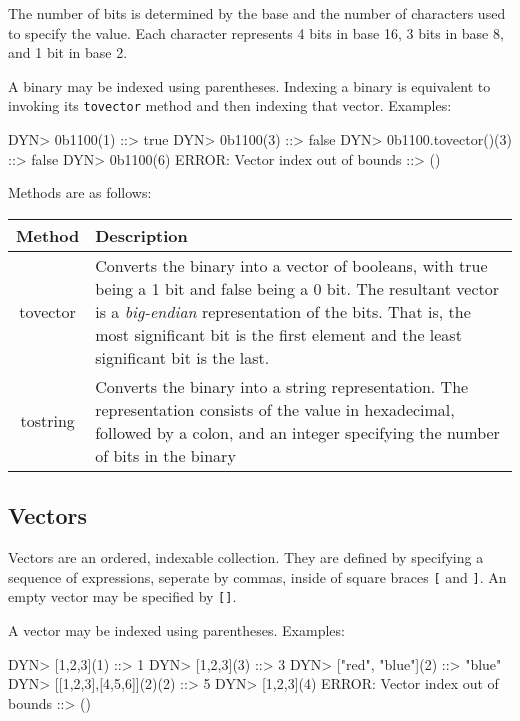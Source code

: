 \documentclass[11pt]{article}
\newcommand{\literal}[1]{\lstinline[style=DSL,identifierstyle=\itshape]!#1!}
\newcommand{\keyword}[1]{\literal{#1}}
\newcommand{\variable}[1]{\literal{#1}}
\begin{document}
The number of bits is determined by the base and the number of characters used to specify the value.
Each character represents 4 bits in base 16, 3 bits in base 8, and 1 bit in base 2.

A binary may be indexed using parentheses.  Indexing a binary is equivalent to invoking its \variable{tovector} method
and then indexing that vector.  Examples:


\begin{dsl}
DYN> 0b1100(1)
::> true
DYN> 0b1100(3)
::> false
DYN> 0b1100.tovector()(3)
::> false
DYN> 0b1100(6)
ERROR: Vector index out of bounds
::> ()
\end{dsl}

Methods are as follows:

\begin{center}
\begin{tabular}{|c|p{3.5in}|}
\hline
Method & Description\\
\hline
tovector & Converts the binary into a vector of booleans, with true being a 1 bit and false being a 0 bit.  The resultant vector is a {\it big-endian}
representation of the bits.  That is, the most significant bit is the first element and the least significant bit is the last.\\
\hline
tostring & Converts the binary into a string representation.  The representation consists of the value in hexadecimal, followed by a colon, and an integer specifying the number of bits in the binary \\
\hline
\end{tabular}
\end{center}



\subsection{Vectors}

Vectors are an ordered, indexable collection.  They are defined by
specifying a sequence of expressions, seperate by commas, inside of
square braces \keyword{[} and \keyword{]}.  An empty vector may be specified by \literal{[]}.

A vector may be indexed using parentheses.  Examples:

\begin{dsl}
DYN> [1,2,3](1)
::> 1
DYN> [1,2,3](3)
::> 3
DYN> ["red", "blue"](2)
::> "blue"
DYN> [[1,2,3],[4,5,6]](2)(2)
::> 5
DYN> [1,2,3](4)
ERROR: Vector index out of bounds
::> ()
\end{dsl}
\end{document}

